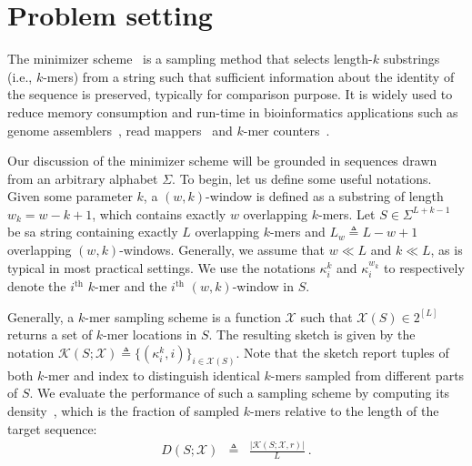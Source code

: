 \label{c4:minimizer}
\section{Problem setting}
The minimizer scheme~\citep{roberts05,schleimer03} is a sampling method that selects length-$k$ substrings (i.e., $k$-mers) from a string such that sufficient information about the identity of the sequence is preserved, typically for comparison purpose. It is widely used to reduce memory consumption and run-time in bioinformatics applications such as genome assemblers~\citep{ye12}, read mappers~\citep{jain20,li18minimap2} and $k$-mer counters~\citep{deorowicz15kmc,erbert17gerbil}. 

Our discussion of the minimizer scheme will be grounded in sequences drawn from an arbitrary alphabet $\Sigma$. To begin, let us define some useful notations. Given some parameter $k$, a $(w,k)$-window is defined as a substring of length $w_k=w-k+1$, which contains exactly $w$ overlapping $k$-mers. Let $S \in \Sigma^{L+k-1}$ be sa string containing exactly $L$ overlapping $k$-mers and $L_w\triangleq L-w+1$ overlapping $(w,k)$-windows. Generally, we assume that $w\ll L$ and $k\ll L$, as is typical in most practical settings. We use the notations $\kappa^k_i$ and $\kappa^{w_k}_i$ to respectively denote the $i^{\text{th}}$ $k$-mer and the $i^{\text{th}}$ $(w, k)$-window in $S$. 

Generally, a $k$-mer sampling scheme is a function $\mathcal{X}$ such that $\mathcal{X}(S) \in 2^{[L]}$ returns a set of $k$-mer locations in $S$. The resulting sketch is given by the notation $\mathcal{K}(S; \mathcal{X}) \triangleq \{(\kappa^k_i, i)\}_{i \in \mathcal{X}(S)}$. Note that the sketch report tuples of both $k$-mer and index to distinguish identical $k$-mers sampled from different parts of $S$. We evaluate the performance of such a sampling scheme by computing its density~\citep{marcais17}, which is the fraction of sampled $k$-mers relative to the length of the target sequence:
\begin{eqnarray}
{D}(S; \mathcal{X}) &\triangleq& \frac{\left|\mathcal{K}(S; \mathcal{X}, r)\right|}{L} \ .
\label{c5-eq:density}
\end{eqnarray} 


